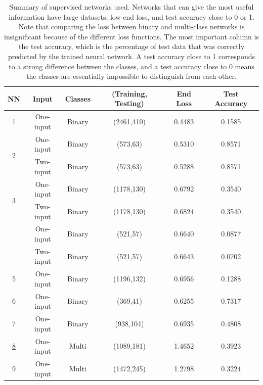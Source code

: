 \documentclass[a4paper]{article}
\begin{document}
\begin{table}[h!]
\centering
\begin{tabular}{||c c c c c c||} 
 \hline
 NN & Input & Classes & (Training, Testing) & End Loss & Test Accuracy \\ [0.5ex] 
 \hline\hline
 1 & One-input & Binary & (2461,410) & 0.4483 & 0.1585 \\
 \multirow{2}{*}{\hfil 2} & One-input & Binary & (573,63) & 0.5310 & 0.8571 \\ 
  & Two-input & Binary & (573,63) & 0.5288 & 0.8571 \\ 
  \multirow{2}{*}{\hfil 3} & One-input & Binary & (1178,130) & 0.6792 & 0.3540 \\ 
  & Two-input & Binary & (1178,130) & 0.6824 & 0.3540 \\
 \rowcolor{pink}
  & One-input & Binary & (521,57) & 0.6640 & 0.0877 \\
  \rowcolor{pink}
 \multirow{-2}{*}{\hfil \hyperlink{binary}{4}}& Two-input & Binary & (521,57) & 0.6643 & 0.0702 \\
 5 & One-input & Binary & (1196,132) & 0.6956 & 0.1288 \\
 6 & One-input & Binary & (369,41) & 0.6255 & 0.7317 \\
 7 & One-input & Binary & (938,104) & 0.6935 & 0.4808 \\
 \rowcolor{pink}
 \hyperlink{multi}{8} & One-input & Multi & (1089,181) & 1.4652 & 0.3923 \\
 9 & One-input & Multi & (1472,245) & 1.2798 & 0.3224 \\
 \hline
\end{tabular}
\caption{Summary of supervised networks used. Networks that can give the most useful information have large datasets, low end loss, and test accuracy close to 0 or 1. Note that comparing the loss between binary and multi-class networks is insignificant because of the different loss functions. The most important column is the test accuracy, which is the percentage of test data that was correctly predicted by the trained neural network. A test accuracy close to 1 corresponds to a strong difference between the classes, and a test accuracy close to 0 means the classes are essentially impossible to distinguish from each other. }
\label{table:1}
\end{table}
\end{document}

